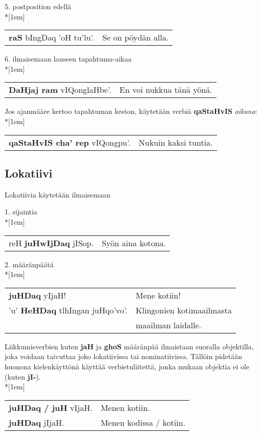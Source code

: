 \documentclass{book}
\begin{document}
5. postposition edellä
\\*[1em]
\begin{tabular}{l l}
    \textbf{raS} bIngDaq 'oH tu'lu'. & Se on pöydän alla. \\
\end{tabular}

6. ilmaisemaan lauseen tapahtuma-aikaa\\*[1em]
\begin{tabular}{l l}
    \textbf{DaHjaj ram} vIQonglaHbe'. & En voi nukkua tänä yönä. \\
\end{tabular}

Jos ajanmääre kertoo tapahtuman keston, käytetään verbiä \textbf{qaStaHvIS} \textit{aikana}:\\*[1em]
\begin{tabular}{l l}
    \textbf{qaStaHvIS cha' rep} vIQongpu'. & Nukuin kaksi tuntia. \\
\end{tabular}

\subsection{Lokatiivi}

Lokatiivia käytetään ilmaisemaan

1. sijaintia\\*[1em]
\begin{tabular}{l l}
    reH \textbf{juHwIjDaq} jISop. & Syön aina kotona. \\
\end{tabular}

2. määränpäätä\\*[1em]
\begin{tabular}{l l}
    \textbf{juHDaq} yIjaH! & Mene kotiin! \\
    'u' \textbf{HeHDaq} tlhIngan juHqo'vo'. & Klingonien kotimaailmasta \\
    & maailman laidalle. \\
\end{tabular}

Liikkumisverbien kuten \textbf{jaH} ja \textbf{ghoS} määränpää ilmaistaan suoralla objektilla, joka voidaan taivuttaa joko lokatiivissa tai nominatiivissa. Tällöin pidetään huonona kielenkäyttönä käyttää verbietuliitettä, jonka mukaan objektia ei ole (kuten \textbf{jI-}).\\*[1em]
\begin{tabular}{l l}
    \textbf{juHDaq / juH} vIjaH. & Menen kotiin. \\
    \textbf{juHDaq} jIjaH. & Menen kodissa / kotiin. \\
\end{tabular}
\end{document}
